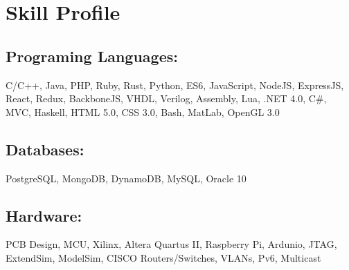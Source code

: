 \documentclass[10pt]{article}
\begin{document}
\section*{Skill Profile}
\subsection*{Programing Languages:}
C/C++, Java, PHP, Ruby, Rust, Python, ES6, JavaScript, NodeJS, ExpressJS, React, Redux, BackboneJS, VHDL, Verilog, Assembly, Lua, .NET 4.0, C\#, MVC, Haskell, HTML 5.0, CSS 3.0, Bash, MatLab, OpenGL 3.0
\subsection*{Databases:}
PostgreSQL, MongoDB, DynamoDB, MySQL, Oracle 10
\subsection*{Hardware:}
PCB Design, MCU, Xilinx, Altera Quartus II, Raspberry Pi, Ardunio, JTAG, ExtendSim, ModelSim, CISCO Routers/Switches, VLANs, Pv6, Multicast
\end{document}

